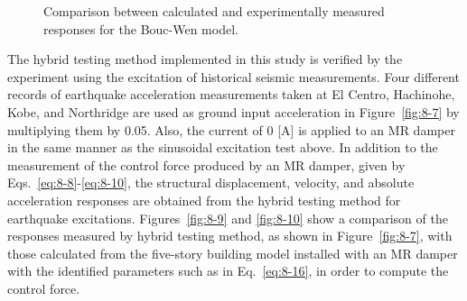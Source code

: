 \begin{figure}[H]
\centering
{}
\caption{Comparison between calculated and experimentally measured responses for the Bouc-Wen model.}
\label{fig:8-8}
\end{figure}

The hybrid testing method implemented in this study is verified by the experiment using the excitation of historical seismic measurements. Four different records of earthquake acceleration measurements taken at El Centro, Hachinohe, Kobe, and Northridge are used as ground input acceleration in Figure~\ref{fig:8-7} by multiplying them by 0.05. Also, the current of 0 [A] is applied to an MR damper in the same manner as the sinusoidal excitation test above. In addition to the measurement of the control force produced by an MR damper, given by Eqs.~\eqref{eq:8-8}-\eqref{eq:8-10}, the structural displacement, velocity, and absolute acceleration responses are obtained from the hybrid testing method for earthquake excitations. Figures~\ref{fig:8-9} and \ref{fig:8-10} show a comparison of the responses measured by hybrid testing method, as shown in Figure~\ref{fig:8-7}, with those calculated from the five-story building model installed with an MR damper with the identified parameters such as in Eq.~\eqref{eq:8-16}, in order to compute the control force. 

